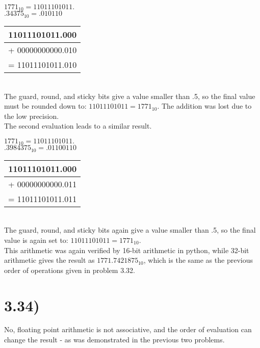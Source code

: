 \documentclass[a4paper,11pt]{article}
\begin{document}
\noindent $ 1771_{10} = 11011101011. $ \\
$ .34375_{10} = .010110$ \\

\begin{tabular}{ r   }	
   11011101011.000 \\
  \hline
  + 00000000000.010 \\
  \hline
  \hline
  = 11011101011.010\\
\end{tabular} \\

\noindent The guard, round, and sticky bits give a value smaller than .5, so the final value must be rounded down to: $11011101011 = 1771_{10}.$  The addition was lost due to the low precision. \\

\noindent The second evaluation leads to a similar result.

\noindent $ 1771_{10} = 11011101011. $ \\
$ .3984375_{10} = .01100110 $ \\

\begin{tabular}{ r   }	
   11011101011.000 \\
  \hline
  + 00000000000.011 \\
  \hline
  \hline
  = 11011101011.011\\
\end{tabular} \\

\noindent The guard, round, and sticky bits again give a value smaller than .5, so the final value is again set to: $11011101011 = 1771_{10}.$ \\

\noindent  This arithmetic was again verified by 16-bit arithmetic in python, while 32-bit arithmetic gives the result as  $1771.7421875_{10}$, which is the same as the previous order of operations given in problem 3.32.


\section*{3.34)} 
No,  floating point arithmetic is not associative, and the order of evaluation can change the result - as was demonstrated in the previous two problems.

\end{document}

